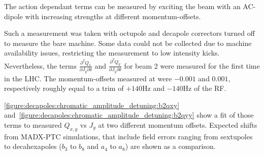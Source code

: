 The action dependant terms can be measured by exciting the beam with an AC-dipole with increasing
strengths at different momentum-offsets.

Such a measurement was taken with octupole and decapole correctors turned off to measure the bare
machine. Some data could not be collected due to machine availability issues, restricting the
measurement to low intensity kicks. 
Nevertheless, the terms $\frac{\partial^2 Q_x}{\partial J_y \partial \delta}$ and $\frac{\partial^2
Q_y}{\partial J_y \partial \delta}$ for beam 2 were measured for the first time in the LHC. The
momentum-offsets measured at were $-0.001$ and $0.001$, respectively roughly equal to a trim of 
$+140$Hz and $-140$Hz of the RF.

\cref{figure:decapoles:chromatic_amplitude_detuning:b2qxy}
and~\cref{figure:decapoles:chromatic_amplitude_detuning:b2qyy} show a fit of those terms to measured
$Q_{x,y}$ vs $J_{y}$ at two different momentum offsets. Expected shifts from MADX-PTC simulations,
that include field errors ranging from sextupoles to decahexapoles ($b_3$ to $b_8$ and $a_4$ to
$a_8$) are shown as a comparison.

